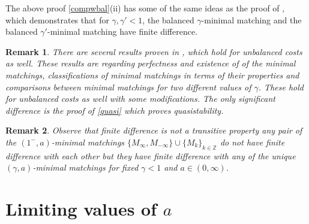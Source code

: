 \documentclass{article}
\newtheorem{remark}{Remark}
\newcommand{\Z}{{\mathbb Z}}
\begin{document}
The above proof \cref{compwbal}(ii) has some of the same ideas as the
proof of  \cite[Theorem 3(ii)]{minimal}, which demonstrates that for
$\gamma,\gamma'<1$, the balanced $\gamma$-minimal matching and the
balanced $\gamma'$-minimal matching have finite difference.









\begin{remark}\label{rem:canonical}
  There are several results proven in \cite[Theorem 1,2,3]{minimal}, which hold for
unbalanced costs as well. These results are regarding perfectness and
existence of of the
minimal matchings, classifications of minimal matchings in terms of
their properties and comparisons between minimal matchings for two
different values of $\gamma$. These hold for unbalanced costs as well
with some modifications. The only significant difference is the proof
of \cref{quasi} which proves quasistability.


\end{remark}




\begin{remark} \label{rem:trans}
Observe that finite difference is not a transitive property any pair of the
$(1^-,a)$-minimal matchings
$\{M_\infty,M_{-\infty}\}\cup\{M_k\}_{k\in\Z}$ do not have finite
difference with each other but they have finite difference with any of
the unique
$(\gamma,a)$-minimal matchings for fixed $\gamma<1$ and $a\in(0,\infty)$.
\end{remark}










































\section{Limiting values of $a$}\label{sec:lims}
\end{document}
